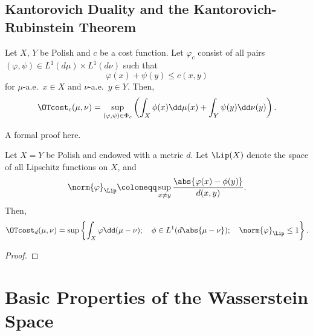 \documentclass[oneside,reqno,letterpaper]{amsart}
\begin{document}
\subsection{Kantorovich Duality and the Kantorovich-Rubinstein Theorem}

\begin{theorem}
  Let \(X\), \(Y\) be Polish and \(c\) be a \lsc cost function.
  Let \(\varphi_c\) consist of all pairs \((\varphi, \psi) \in L^1(d\mu) \times L^1(d\nu)\) such that
  \[
    \varphi(x) + \psi(y) \leq c(x, y)
  \]
  for \(\mu\)-a.e.\ \(x \in X\) and \(\nu\)-a.e.\ \(y \in Y\).
  Then,
  \[
    \OTcost_c(\mu, \nu)
    = \sup_{(\varphi, \psi) \in \Phi_c} \left( \int_X \phi(x) \dd \mu(x) + \int_Y \psi(y) \dd \nu(y) \right).
  \]
\end{theorem}
\begin{itodo}
  A formal proof here.
\end{itodo}



\begin{theorem}\label{prop:Kan-Rub}
  Let \(X = Y\) be Polish and endowed with a \lsc metric \(d\).
  Let \(\Lip(X)\) denote the space of all Lipschitz functions on \(X\), and
  \[
    \norm{\varphi}_{\Lip}
    \coloneqq \sup_{x \neq y} \frac{\abs{\varphi(x) - \phi(y)}}{d(x, y)}.
  \]
  Then,
  \[
    \OTcost_d(\mu, \nu)
    = \sup\left\{ \int_X \varphi \dd (\mu - \nu); \quad \phi \in L^1(d \abs{\mu - \nu}); \quad \norm{\varphi}_{\Lip} \leq 1 \right\}.
  \]
\end{theorem}
\begin{itodo}
\begin{proof}
\end{proof}
\end{itodo}




\section{Basic Properties of the Wasserstein Space}
\end{document}
